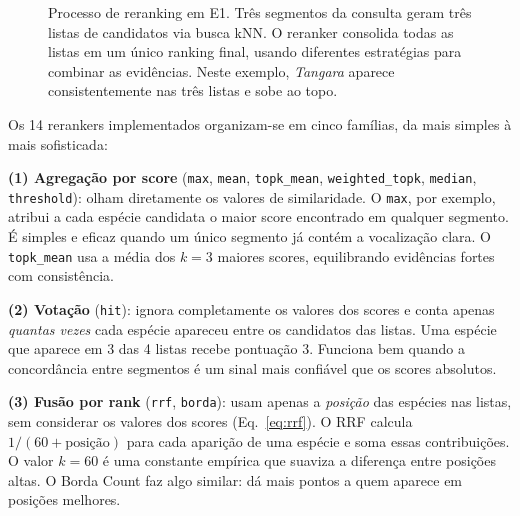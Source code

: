 \documentclass[12pt]{article}
\begin{document}
\begin{figure}[ht]
\caption{Processo de reranking em E1. Três segmentos da consulta geram três
listas de candidatos via busca kNN. O reranker consolida todas as listas em
um único ranking final, usando diferentes estratégias para combinar as evidências.
Neste exemplo, \textit{Tangara} aparece consistentemente nas três listas e
sobe ao topo.}
\label{fig:reranking}
\end{figure}

Os 14 rerankers implementados organizam-se em cinco famílias, da mais simples
à mais sofisticada:

\textbf{(1) Agregação por score} (\texttt{max}, \texttt{mean},
\texttt{topk\_mean}, \texttt{weighted\_topk}, \texttt{median}, \texttt{threshold}):
olham diretamente os valores de similaridade. O \texttt{max}, por exemplo,
atribui a cada espécie candidata o maior score encontrado em qualquer segmento.
É simples e eficaz quando um único segmento já contém a vocalização clara.
O \texttt{topk\_mean} usa a média dos $k=3$ maiores scores, equilibrando
evidências fortes com consistência.

\textbf{(2) Votação} (\texttt{hit}): ignora completamente os valores dos
scores e conta apenas \emph{quantas vezes} cada espécie apareceu entre os
candidatos das listas. Uma espécie que aparece em 3 das 4 listas recebe
pontuação 3. Funciona bem quando a concordância entre segmentos é um sinal
mais confiável que os scores absolutos.

\textbf{(3) Fusão por rank} (\texttt{rrf}, \texttt{borda}): usam apenas a
\emph{posição} das espécies nas listas, sem considerar os valores dos scores
(Eq.~\eqref{eq:rrf}). O RRF calcula $1/(60 + \text{posição})$ para cada
aparição de uma espécie e soma essas contribuições. O valor $k=60$ é uma
constante empírica que suaviza a diferença entre posições altas. O Borda Count
faz algo similar: dá mais pontos a quem aparece em posições melhores.
\end{document}
